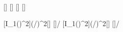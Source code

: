 [\W\per\m\squared]
[\m]
[\m]
[\m]

[I_1\left(\right)^2]{\IaX*(\raX/\rbX)^2}[\W\per\m\squared]
[]{\raX/\rbX}
[I_1\left(\right)^2]{\IaX*(\raX/\rcX)^2}[\W\per\m\squared]
[]{\raX/\rcX}
